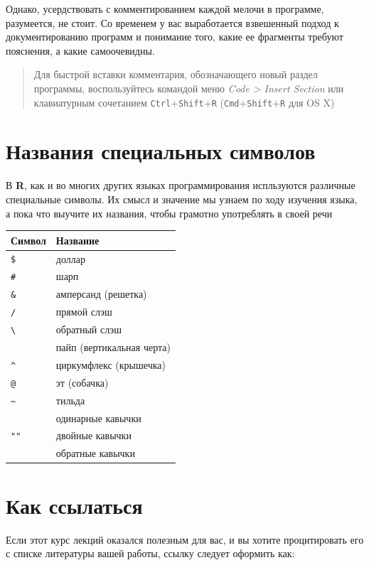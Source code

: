 \documentclass[]{book}
\begin{document}
Однако, усердствовать с комментированием каждой мелочи в программе,
разумеется, не стоит. Со временем у вас выработается взвешенный подход к
документированию программ и понимание того, какие ее фрагменты требуют
пояснения, а какие самоочевидны.

\begin{quote}
Для быстрой вставки комментария, обозначающего новый раздел программы,
воспользуйтесь командой меню \emph{Code \textgreater{} Insert Section}
или клавиатурным сочетанием \texttt{Ctrl}+\texttt{Shift}+\texttt{R}
(\texttt{Cmd}+\texttt{Shift}+\texttt{R} для OS X)
\end{quote}

\section*{Названия специальных символов}\label{--}

В \textbf{R}, как и во многих других языках программирования испльзуются
различные специальные символы. Их смысл и значение мы узнаем по ходу
изучения языка, а пока что выучите их названия, чтобы грамотно
употреблять в своей речи

\begin{longtable}[]{@{}ll@{}}
\toprule
Символ & Название\tabularnewline
\midrule
\endhead
\texttt{\$} & доллар\tabularnewline
\texttt{\#} & шарп\tabularnewline
\texttt{\&} & амперсанд (решетка)\tabularnewline
\texttt{/} & прямой слэш\tabularnewline
\texttt{\textbackslash{}} & обратный слэш\tabularnewline
\texttt{\textbar{}} & пайп (вертикальная черта)\tabularnewline
\texttt{\^{}} & циркумфлекс (крышечка)\tabularnewline
\texttt{@} & эт (собачка)\tabularnewline
\texttt{\textasciitilde{}} & тильда\tabularnewline
\texttt{\textquotesingle{}\textquotesingle{}} & одинарные
кавычки\tabularnewline
\texttt{""} & двойные кавычки\tabularnewline
\texttt{\textasciigrave{}\textasciigrave{}} & обратные
кавычки\tabularnewline
\bottomrule
\end{longtable}

\section*{Как ссылаться}\label{-}

Если этот курс лекций оказался полезным для вас, и вы хотите
процитировать его с списке литературы вашей работы, ссылку следует
оформить как:
\end{document}
